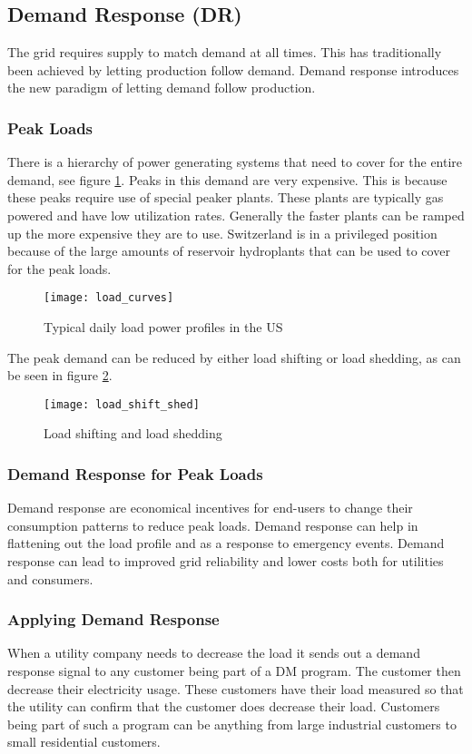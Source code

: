 \subsection{Demand Response (DR)}
The grid requires supply to match demand at all times.
This has traditionally been achieved by letting production follow demand.
Demand response introduces the new paradigm of letting demand follow production.

\subsubsection{Peak Loads}
There is a hierarchy of power generating systems that need to cover for the entire demand, see figure \ref{fig:load_curves}.
Peaks in this demand are very expensive.
This is because these peaks require use of special peaker plants.
These plants are typically gas powered and have low utilization rates.
Generally the faster plants can be ramped up the more expensive they are to use.
Switzerland is in a privileged position because of the large amounts of reservoir hydroplants that can be used to cover for the peak loads.\\

\begin{figure}
    \centering
    \texttt{[image: load\_curves]}
    \caption{Typical daily load power profiles in the US}
    \label{fig:load_curves}
\end{figure}

The peak demand can be reduced by either load shifting or load shedding, as can be seen in figure \ref{fig:load_shift_shed}.

\begin{figure}
    \centering
    \texttt{[image: load\_shift\_shed]}
    \caption{Load shifting and load shedding}
    \label{fig:load_shift_shed}
\end{figure}

\subsubsection{Demand Response for Peak Loads}
Demand response are economical incentives for end-users to change their consumption patterns to reduce peak loads.
Demand response can help in flattening out the load profile and as a response to emergency events.
Demand response can lead to improved grid reliability and lower costs both for utilities and consumers.

\subsubsection{Applying Demand Response}
When a utility company needs to decrease the load it sends out a demand response signal to any customer being part of a DM program.
The customer then decrease their electricity usage.
These customers have their load measured so that the utility can confirm that the customer does decrease their load.
Customers being part of such a program can be anything from large industrial customers to small residential customers.\\

